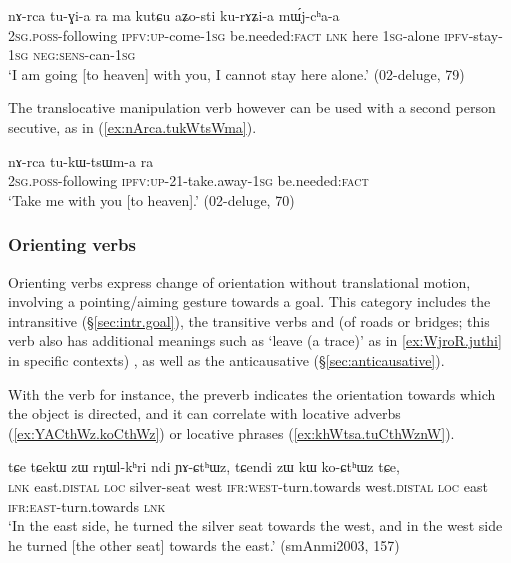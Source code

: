 \begin{exe}
\ex \label{ex:nArca.tuGia}
\gll  nɤ-rca tu-ɣi-a ra ma kutɕu aʑo-sti ku-rɤʑi-a mɯ́j-cʰa-a \\
\textsc{2sg}.\textsc{poss}-following \textsc{ipfv}:\textsc{up}-come-\textsc{1sg} be.needed:\textsc{fact}  \textsc{lnk} here \textsc{1sg}-alone \textsc{ipfv}-stay-\textsc{1sg} \textsc{neg}:\textsc{sens}-can-\textsc{1sg} \\
\glt `I am going [to heaven] with you, I cannot stay here alone.' (02-deluge, 79)
\end{exe}
 
 The translocative manipulation verb  however can be used with a second person secutive, as in (\ref{ex:nArca.tukWtsWma}).
 
 \begin{exe}
\ex \label{ex:nArca.tukWtsWma}
\gll    nɤ-rca tu-kɯ-tsɯm-a ra \\
\textsc{2sg}.\textsc{poss}-following \textsc{ipfv}:\textsc{up}-2\fl{}1-take.away-\textsc{1sg} be.needed:\textsc{fact}\\
\glt `Take me with you [to heaven].' (02-deluge, 70)
 \end{exe}
 
\subsubsection{Orienting verbs} \label{sec:orienting.verbs} 
Orienting verbs express change of orientation without translational motion, involving a pointing/aiming gesture towards a goal. This category includes the intransitive  (§\ref{sec:intr.goal}), the transitive verbs  and  (of roads or bridges; this verb also has additional meanings such as `leave (a trace)' as in \ref{ex:WjroR.juthi} in specific contexts) , as well as the anticausative  (§\ref{sec:anticausative}). 

With the verb  for instance, the preverb indicates the orientation towards which the object is directed, and it can correlate with locative adverbs (\ref{ex:YACthWz.koCthWz}) or locative phrases (\ref{ex:khWtsa.tuCthWznW}).  

 \begin{exe}
\ex \label{ex:YACthWz.koCthWz}
\gll  tɕe tɕekɯ zɯ rŋɯl-kʰri ndi ɲɤ-ɕtʰɯz, tɕendi zɯ kɯ ko-ɕtʰɯz tɕe, \\
\textsc{lnk} east.\textsc{distal} \textsc{loc} silver-seat west \textsc{ifr}:\textsc{west}-turn.towards west.\textsc{distal} \textsc{loc} east \textsc{ifr}:\textsc{east}-turn.towards  \textsc{lnk} \\
\glt `In the east side, he turned the silver seat towards the west, and in the west side he turned [the other seat] towards the east.' (smAnmi2003, 157)
 \end{exe}
 
